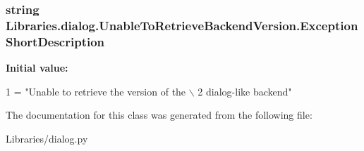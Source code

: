 \subsubsection[{\texorpdfstring{Exception\+Short\+Description}{ExceptionShortDescription}}]{\setlength{\rightskip}{0pt plus 5cm}string Libraries.\+dialog.\+Unable\+To\+Retrieve\+Backend\+Version.\+Exception\+Short\+Description\hspace{0.3cm}{\ttfamily [static]}}\hypertarget{class_libraries_1_1dialog_1_1_unable_to_retrieve_backend_version_a6d631d4a6ea86b993497c65964f2447b}{}\label{class_libraries_1_1dialog_1_1_unable_to_retrieve_backend_version_a6d631d4a6ea86b993497c65964f2447b}
{\bfseries Initial value\+:}
\begin{DoxyCode}
1 = \textcolor{stringliteral}{"Unable to retrieve the version of the \(\backslash\)}
2 \textcolor{stringliteral}{dialog-like backend"}
\end{DoxyCode}


The documentation for this class was generated from the following file\+:\begin{DoxyCompactItemize}
\item 
Libraries/dialog.\+py\end{DoxyCompactItemize}
